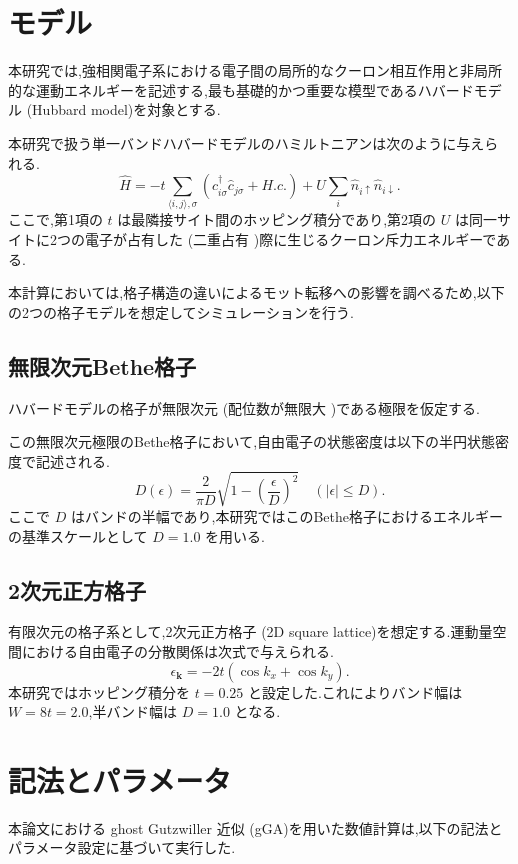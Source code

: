 \section{モデル}
本研究では,強相関電子系における電子間の局所的なクーロン相互作用と非局所的な運動エネルギーを記述する,最も基礎的かつ重要な模型であるハバードモデル (Hubbard model)を対象とする.

本研究で扱う単一バンドハバードモデルのハミルトニアンは次のように与えられる.
\begin{equation}
    \hat{H} = -t \sum_{\langle i,j \rangle, \sigma} (\hat{c}_{i\sigma}^\dagger \hat{c}_{j\sigma} + H.c.)+ U \sum_i \hat{n}_{i\uparrow} \hat{n}_{i\downarrow}.
\end{equation}
ここで,第1項の $t$ は最隣接サイト間のホッピング積分であり,第2項の $U$ は同一サイトに2つの電子が占有した (二重占有 )際に生じるクーロン斥力エネルギーである.

本計算においては,格子構造の違いによるモット転移への影響を調べるため,以下の2つの格子モデルを想定してシミュレーションを行う.

\subsection{無限次元Bethe格子}
ハバードモデルの格子が無限次元 (配位数が無限大 )である極限を仮定する.

この無限次元極限のBethe格子において,自由電子の状態密度は以下の半円状態密度で記述される.
\begin{equation}
    D(\epsilon)= \frac{2}{\pi D} \sqrt{1 - \left(\frac{\epsilon}{D}\right)^2} \quad (|\epsilon| \le D).
\end{equation}
ここで $D$ はバンドの半幅であり,本研究ではこのBethe格子におけるエネルギーの基準スケールとして $D=1.0$ を用いる.

\subsection{2次元正方格子}
有限次元の格子系として,2次元正方格子 (2D square lattice)を想定する.運動量空間における自由電子の分散関係は次式で与えられる.
\begin{equation}
    \epsilon_{\mathbf{k}} = -2t (\cos k_x + \cos k_y).
\end{equation}
本研究ではホッピング積分を $t = 0.25$ と設定した.これによりバンド幅は $W = 8t = 2.0$,半バンド幅は $D = 1.0$ となる.

\section{記法とパラメータ}
本論文における ghost Gutzwiller 近似 (gGA)を用いた数値計算は,以下の記法とパラメータ設定に基づいて実行した.

